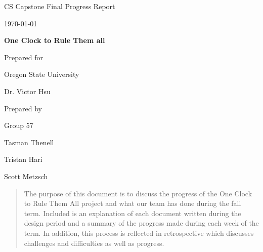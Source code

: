 \documentclass[onecolumn, draftclsnofoot,10pt, compsoc]{IEEEtran}
\def \CapstoneTeamName{		One Clock to Rule Them all}
\def \CapstoneTeamNumber{		57}
\def \GroupMemberOne{			Tasman Thenell}
\def \GroupMemberTwo{			Tristan Hari}
\def \GroupMemberThree{			Scott Metzsch}
\def \CapstoneProjectName{		One Clock to Rule Them all}
\def \CapstoneSponsorCompany{	Oregon State University}
\def \CapstoneSponsorPerson{		Dr. Victor Hsu}
\def \DocType{		%
				Final Progress Report
				}
\newcommand{\NameSigPair}[1]{\par
\makebox[2.75in][r]{#1} \hfil 	\makebox[3.25in]{\makebox[2.25in]{\hrulefill} \hfill		\makebox[.75in]{\hrulefill}}
\par\vspace{-12pt} \textit{\tiny\noindent
\makebox[2.75in]{} \hfil		\makebox[3.25in]{\makebox[2.25in][r]{Signature} \hfill	\makebox[.75in][r]{Date}}}}
\renewcommand{\NameSigPair}[1]{#1}
\begin{document}
\begin{titlepage}
    \begin{singlespace}
        \hfill
        \par\vspace{.2in}
        \centering
        \scshape{
            \huge CS Capstone \DocType \par
            {\large\today}\par
            \vspace{.5in}
            \textbf{\Huge\CapstoneProjectName}\par
            \vfill
            {\large Prepared for}\par
            \Huge \CapstoneSponsorCompany\par
            \vspace{5pt}
            {\Large\NameSigPair{\CapstoneSponsorPerson}\par}
            {\large Prepared by }\par
            Group\CapstoneTeamNumber\par
            \vspace{5pt}
            {\Large
                \NameSigPair{\GroupMemberOne}\par
                \NameSigPair{\GroupMemberTwo}\par
                \NameSigPair{\GroupMemberThree}\par
            }
            \vspace{20pt}
        }
        \begin{abstract}
        	The purpose of this document is to discuss the progress of the One Clock to Rule Them All project and what our team has done during the fall term.
Included is an explanation of each document written during the design period and a summary of the progress made during each week of the term.
In addition, this process is reflected in retrospective which discusses challenges and difficulties as well as progress.
        \end{abstract}
    \end{singlespace}
\end{titlepage}
\newpage
{}
\tableofcontents
\clearpage
\end{document}
